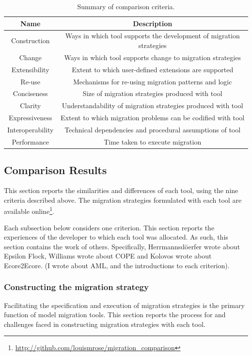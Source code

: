 \begin{table}[hbtp]
	\centering
	\caption{Summary of comparison criteria.}
	\label{tab:criteria}
	\begin{tabular}{|c|c|}
	\hline
	\textbf{Name}    & \textbf{Description} \\
	\hline
	Construction     & Ways in which tool supports the development of migration strategies \\
	\hline
	Change           & Ways in which tool supports change to migration strategies \\
	\hline
	Extensibility    & Extent to which user-defined extensions are supported \\
	\hline
	Re-use           & Mechanisms for re-using migration patterns and logic \\
	\hline
	Conciseness      & Size of migration strategies produced with tool \\
	\hline
	Clarity          & Understandability of migration strategies produced with tool \\
	\hline
	Expressiveness   & Extent to which migration problems can be codified with tool \\
	\hline
	Interoperability & Technical dependencies and procedural assumptions of tool \\
	\hline
	Performance      & Time taken to execute migration \\
	\hline
	\end{tabular}
\end{table}


\subsection{Comparison Results}
\label{sec:results}
This section reports the similarities and differences of each tool, using the nine criteria described above. The migration strategies formulated with each tool are available online\footnote{\url{http://github.com/louismrose/migration_comparison}}. 

Each subsection below considers one criterion. This section reports the experiences of the developer to which each tool was allocated. As such, this section contains the work of others. Specifically, Herrmannsd\"{o}erfer wrote about Epsilon Flock, Williams wrote about COPE and Kolovos wrote about Ecore2Ecore. (I wrote about AML, and the introductions to each criterion). 

\subsubsection{Constructing the migration strategy}
\label{subsec:constructing}
Facilitating the specification and execution of migration strategies is the primary function of model migration tools. This section reports the process for and challenges faced in constructing migration strategies with each tool.

